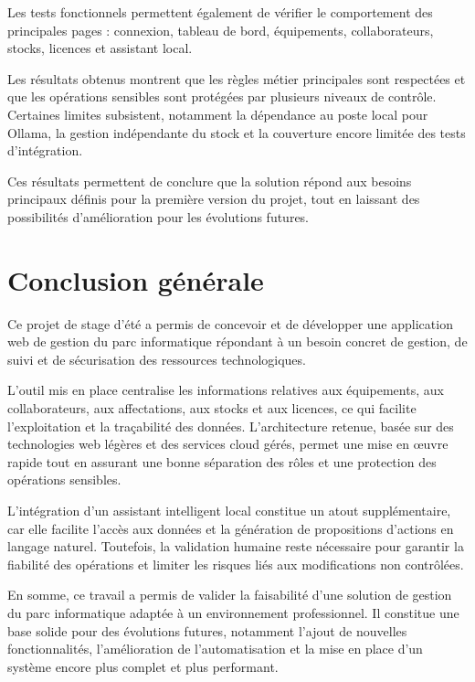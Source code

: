 \documentclass{rapportENSIAS}
\begin{document}
Les tests fonctionnels permettent également de vérifier le comportement des principales pages : connexion, tableau de bord, équipements, collaborateurs, stocks, licences et assistant local.

Les résultats obtenus montrent que les règles métier principales sont respectées et que les opérations sensibles sont protégées par plusieurs niveaux de contrôle. Certaines limites subsistent, notamment la dépendance au poste local pour Ollama, la gestion indépendante du stock et la couverture encore limitée des tests d’intégration.

Ces résultats permettent de conclure que la solution répond aux besoins principaux définis pour la première version du projet, tout en laissant des possibilités d’amélioration pour les évolutions futures.


\newpage
\chapter*{Conclusion générale}

Ce projet de stage d’été a permis de concevoir et de développer une application web de gestion du parc informatique répondant à un besoin concret de gestion, de suivi et de sécurisation des ressources technologiques.

L’outil mis en place centralise les informations relatives aux équipements, aux collaborateurs, aux affectations, aux stocks et aux licences, ce qui facilite l’exploitation et la traçabilité des données. L’architecture retenue, basée sur des technologies web légères et des services cloud gérés, permet une mise en œuvre rapide tout en assurant une bonne séparation des rôles et une protection des opérations sensibles.

L’intégration d’un assistant intelligent local constitue un atout supplémentaire, car elle facilite l’accès aux données et la génération de propositions d’actions en langage naturel. Toutefois, la validation humaine reste nécessaire pour garantir la fiabilité des opérations et limiter les risques liés aux modifications non contrôlées.

En somme, ce travail a permis de valider la faisabilité d’une solution de gestion du parc informatique adaptée à un environnement professionnel. Il constitue une base solide pour des évolutions futures, notamment l’ajout de nouvelles fonctionnalités, l’amélioration de l’automatisation et la mise en place d’un système encore plus complet et plus performant.
\end{document}
